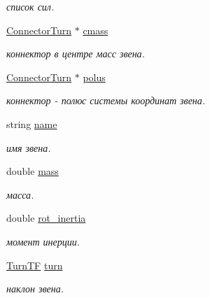 \begin{DoxyCompactItemize}
\begin{DoxyCompactList}\small\item\em список сил. \item\end{DoxyCompactList}\item 
\hyperlink{struct_connector_turn}{ConnectorTurn} $\ast$ \hyperlink{class_segment_a0f3dc25d68321cd5c3e8595fcdbc2ea8}{cmass}
\begin{DoxyCompactList}\small\item\em коннектор в центре масс звена. \item\end{DoxyCompactList}\item 
\hyperlink{struct_connector_turn}{ConnectorTurn} $\ast$ \hyperlink{class_segment_ab137465e247c4b7f5584e4ad558e4138}{polus}
\begin{DoxyCompactList}\small\item\em коннектор -\/ полюс системы координат звена. \item\end{DoxyCompactList}\item 
string \hyperlink{class_segment_a0317dfdef4af06341f86ffbd77aeefd8}{name}
\begin{DoxyCompactList}\small\item\em имя звена. \item\end{DoxyCompactList}\item 
double \hyperlink{class_segment_ae2ac875b86cea3b0dbd60b318d953588}{mass}
\begin{DoxyCompactList}\small\item\em масса. \item\end{DoxyCompactList}\item 
double \hyperlink{class_segment_a9559a2939e6df5ff37f8b30bd2e489ad}{rot\_\-inertia}
\begin{DoxyCompactList}\small\item\em момент инерции. \item\end{DoxyCompactList}\item 
\hyperlink{struct_turn_t_f}{TurnTF} \hyperlink{class_segment_af72f1d60a478761af1f157a4d949e660}{turn}
\begin{DoxyCompactList}\small\item\em наклон звена. \item\end{DoxyCompactList}\end{DoxyCompactItemize}


